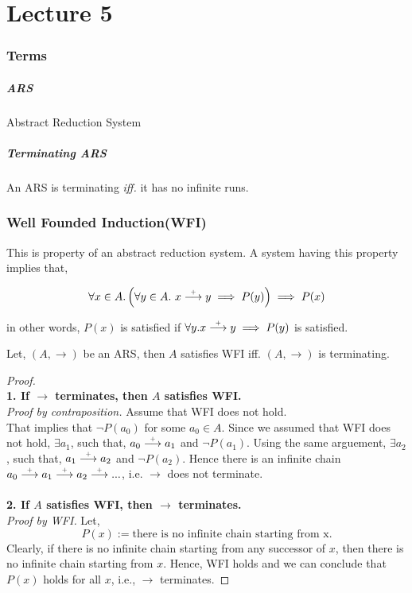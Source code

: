 \chapter{Lecture 5}

\subsection{Terms}

\paragraph{ARS} Abstract Reduction System

\paragraph{Terminating ARS} An ARS is terminating \emph{iff.} it has no infinite runs.

\subsection{Well Founded Induction(WFI)}

This is property of an abstract reduction system. A system having this property implies that,

$$
\forall x \in A. \left( \forall y \in A. \ x \stackrel{\scriptscriptstyle\!+\!}\longrightarrow y \implies P(y) \right) \implies P(x)
$$

in other words,
$P(x)$ is satisfied if $\forall y. x \stackrel{\scriptscriptstyle\!+\!}\longrightarrow y \implies P(y)$ is satisfied.

\begin{theorem}
    Let, $(A, \longrightarrow)$ be an ARS, then $A$ satisfies WFI iff. $(A, \longrightarrow)$ is terminating.
\end{theorem}

\begin{proof}
    \text{} \\
    \textbf{1. If $\longrightarrow$ terminates, then $A$ satisfies WFI.} \\
    \emph{Proof by contraposition.} Assume that WFI does not hold. \\
    That implies that $\neg P(a_0)$ for some $a_0 \in A$. Since we assumed that WFI does not hold, $\exists a_1$, such that, $a_0 \stackrel{\scriptscriptstyle\!+\!}\longrightarrow a_1$ and $\neg P(a_1)$. Using the same arguement, $\exists a_2$, such that, $a_1 \stackrel{\scriptscriptstyle\!+\!}\longrightarrow a_2$ and $\neg P(a_2)$. Hence there is an infinite chain $a_0 \stackrel{\scriptscriptstyle\!+\!}\longrightarrow a_1 \stackrel{\scriptscriptstyle\!+\!}\longrightarrow a_2 \stackrel{\scriptscriptstyle\!+\!}\longrightarrow ...$, i.e. $\longrightarrow$ does not terminate. \\
    \\
    \textbf{2. If $A$ satisfies WFI, then $\longrightarrow$ terminates.} \\
    \emph{Proof by WFI.} Let,
    $$
    P(x) := \text{there is no infinite chain starting from x}.
    $$
    Clearly, if there is no infinite chain starting from any successor of $x$, then there is no infinite chain starting from $x$. Hence, WFI holds and we can conclude that $P(x)$ holds for all $x$, i.e., $\longrightarrow$ terminates.
\end{proof}

